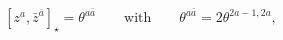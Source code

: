 \begin{equation}\label{cr2}
 [z^a,\bar{z}^{\bar{a}}]_\star=\theta^{a\bar{a}}
 \qquad\text{with}\qquad
 \theta^{a\bar{a}}=2\theta^{2a-1,2a},
\end{equation}

